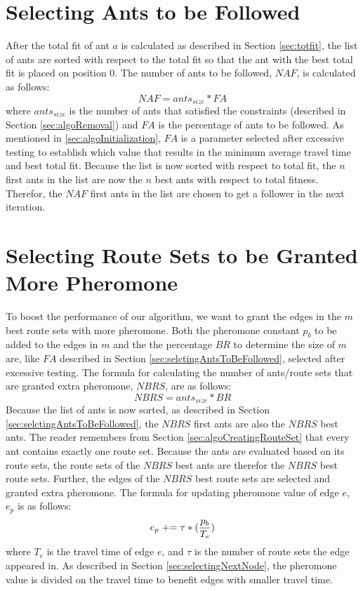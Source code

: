 \section{Selecting Ants to be Followed}
\label{sec:selctingAntsToBeFollowed}
After the total fit of ant $a$ is calculated as described in Section \vref{sec:totfit}, the list of ants are sorted with respect to the total fit so that the ant with the best total fit is placed on position 0. The number of ants to be followed, $NAF$, is calculated as follows:
\newline
$$NAF = ants_{size} * FA$$
\newline 
where $ants_{size}$ is the number of ants that satisfied the constraints (described in Section \vref{sec:algoRemoval}) and $FA$ is the percentage of ants to be followed. As mentioned in \vref{sec:algoInitialization}, $FA$ is a parameter selected after excessive testing to establish which value that results in the minimum average travel time and best total fit. Because the list is now sorted with respect to total fit, the $n$ first ants in the list are now the $n$ best ants with respect to total fitness. Therefor, the $NAF$ first ants in the list are chosen to get a follower in the next iteration. 

\section{Selecting Route Sets to be Granted More Pheromone}
To boost the performance of our algorithm, we want to grant the edges in the $m$ best route sets with more pheromone. Both the pheromone constant $p_b$ to be added to the edges in $m$ and the the percentage $BR$ to determine the size of $m$ are, like $FA$ described in Section \vref{sec:selctingAntsToBeFollowed}, selected after excessive testing. The formula for calculating the number of ants/route sets that are granted extra pheromone, $NBRS$, are as follows:
\newline
$$NBRS = ants_{size} * BR$$
\newline
Because the list of ants is now sorted, as described in Section \vref{sec:selctingAntsToBeFollowed}, the $NBRS$ first ants are also the $NBRS$ best ants. The reader remembers from Section \vref{sec:algoCreatingRouteSet} that every ant contains exactly one route set. Because the ants are evaluated based on its route sets, the route sets of the $NBRS$ best ants are therefor the $NBRS$ best route sets. Further, the edges of the $NBRS$ best route sets are selected and granted extra pheromone. The formula for updating pheromone value of edge $e$, $e_p$ is as follows:
\newline
$$e_p \mathrel{+}= \tau*(\frac{p_b}{T_e})$$ 
\newline
where $T_e$ is the travel time of edge $e$, and $\tau$ is the number of route sets the edge appeared in. As described in Section \vref{sec:selectingNextNode}, the pheromone value is divided on the travel time to benefit edges with smaller travel time. 